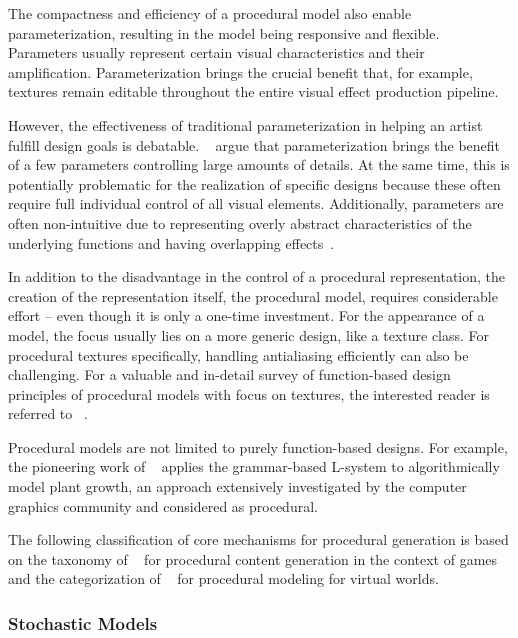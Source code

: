 The compactness and efficiency of a procedural model also enable parameterization, resulting in the model being responsive and flexible. Parameters usually represent certain visual characteristics and their amplification. Parameterization brings the crucial benefit that, for example, textures remain editable throughout the entire visual effect production pipeline.

However, the effectiveness of traditional parameterization in helping an artist fulfill design goals is debatable. \citeauthor*{ebert_2003_tmp}~\cite{ebert_2003_tmp} argue that parameterization brings the benefit of a few parameters controlling large amounts of details. At the same time, this is potentially problematic for the realization of specific designs because these often require full individual control of all visual elements. Additionally, parameters are often non-intuitive due to representing overly abstract characteristics of the underlying functions and having overlapping effects~\cite{bourque_2004_ptm,lagae_2010_pis,gilet_2010_ias,benes_2011_gpm,lasram_2012_ssf,lasram_2012_ptp}.

In addition to the disadvantage in the control of a procedural representation, the creation of the representation itself, the procedural model, requires considerable effort – even though it is only a one-time investment. For the appearance of a model, the focus usually lies on a more generic design, like a texture class. For procedural textures specifically, handling antialiasing efficiently can also be challenging. For a valuable and in-detail survey of function-based design principles of procedural models with focus on textures, the interested reader is referred to \citeauthor*{ebert_2003_tmp}~\cite{ebert_2003_tmp}. 

Procedural models are not limited to purely function-based designs. For example, the pioneering work of \citeauthor*{Prusinkiewicz_2012_TAB}~\cite{Prusinkiewicz_2012_TAB} applies the grammar-based L-system to algorithmically model plant growth, an approach extensively investigated by the computer graphics community and considered as procedural.

The following classification of core mechanisms for procedural generation is based on the taxonomy of \citeauthor*{hendrikx_2013_pcg}~\cite{hendrikx_2013_pcg} for procedural content generation in the context of games and the categorization of \citeauthor*{smelik_2014_aso}~\cite{smelik_2014_aso} for procedural modeling for virtual worlds.


\subsubsection{Stochastic Models}
\label{subsubsec:models_stochastic}

